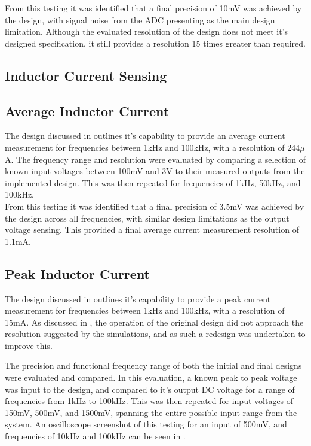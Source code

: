 From this testing it was identified that a final precision of 10mV was achieved by the design, with signal noise from the ADC presenting as the main design limitation. Although the evaluated resolution of the design does not meet it's designed specification, it still provides a resolution 15 times greater than required.


\subsection{Inductor Current Sensing}

\subsection*{Average Inductor Current}

The design discussed in  outlines it's capability to provide an average current measurement for frequencies between 1kHz and 100kHz, with a resolution of 244$\mu$A. The frequency range and resolution were evaluated by comparing a selection of known input voltages between 100mV and 3V to their measured outputs from the implemented design. This was then repeated for frequencies of 1kHz, 50kHz, and 100kHz.\\ 

From this testing it was identified that a final precision of 3.5mV was achieved by the design across all frequencies, with similar design limitations as the output voltage sensing. This provided a final average current measurement resolution of 1.1mA.


\subsection*{Peak Inductor Current}

The design discussed in  outlines it's capability to provide a peak current measurement for frequencies between 1kHz and 100kHz, with a resolution of 15mA. As discussed in , the operation of the original design did not approach the resolution suggested by the simulations, and as such a redesign was undertaken to improve this. 

The precision and functional frequency range of both the initial and final designs were evaluated and compared. In this evaluation, a known peak to peak voltage was input to the design, and compared to it's output DC voltage for a range of frequencies from 1kHz to 100kHz. This was then repeated for input voltages of 150mV, 500mV, and 1500mV, spanning the entire possible input range from the system. An oscilloscope screenshot of this testing for an input of 500mV, and frequencies of 10kHz and 100kHz can be seen in .

